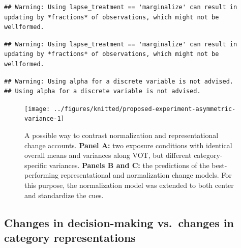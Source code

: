 \documentclass[
  11pt,
  man,floatsintext]{apa6}
\begin{document}
\color{orange}

\begin{verbatim}## Warning: Using lapse_treatment == 'marginalize' can result in updating by *fractions* of observations, which might not be wellformed.
\end{verbatim}

\color{black}\color{orange}

\begin{verbatim}## Warning: Using lapse_treatment == 'marginalize' can result in updating by *fractions* of observations, which might not be wellformed.
\end{verbatim}

\color{black}\color{orange}

\begin{verbatim}## Warning: Using alpha for a discrete variable is not advised.
## Using alpha for a discrete variable is not advised.
\end{verbatim}\color{black}

\begin{figure}

{\centering \texttt{[image: ../figures/knitted/proposed-experiment-asymmetric-variance-1]} 

}

\caption{A possible way to contrast normalization and representational change accounts. \textbf{Panel A:} two exposure conditions with identical overall means and variances along VOT, but different category-specific variances. \textbf{Panels B and C:} the predictions of the best-performing representational and normalization change models. For this purpose, the normalization model was extended to both center and standardize the cues.}\label{fig:proposed-experiment-asymmetric-variance}
\end{figure}

\subsection{Changes in decision-making vs.~changes in category representations}\label{changes-in-decision-making-vs.-changes-in-category-representations}
\end{document}
